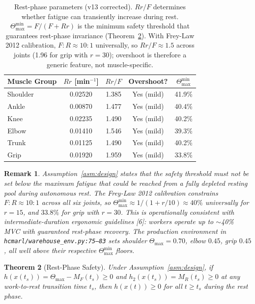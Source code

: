 \documentclass[11pt,a4paper]{article}
\newtheorem{theorem}{Theorem}[section]
\newtheorem{remark}[theorem]{Remark}
\begin{document}
\begin{table}[h]
\centering
\caption{Rest-phase parameters (v13 corrected). $Rr/F$ determines whether
fatigue can transiently increase during rest. $\Theta_{\max}^{\min} =
F/(F+Rr)$ is the minimum safety threshold that guarantees rest-phase
invariance (Theorem~\ref{thm:rest-safety}). With Frey-Law 2012
calibration, $F{:}R \approx 10{:}1$ universally, so $Rr/F \approx 1.5$
across joints (1.96 for grip with $r=30$); overshoot is therefore a
generic feature, not muscle-specific.}\label{tab:rest}
\begin{tabular}{lcccc}
\toprule
\textbf{Muscle Group} & $Rr$ [min$^{-1}$] & $Rr/F$ & \textbf{Overshoot?} & $\Theta_{\max}^{\min}$ \\
\midrule
Shoulder & 0.02520 & 1.385 & Yes (mild) & 41.9\% \\
Ankle    & 0.00870 & 1.477 & Yes (mild) & 40.4\% \\
Knee     & 0.02235 & 1.490 & Yes (mild) & 40.2\% \\
Elbow    & 0.01410 & 1.546 & Yes (mild) & 39.3\% \\
Trunk    & 0.01125 & 1.490 & Yes (mild) & 40.2\% \\
Grip     & 0.01920 & 1.959 & Yes (mild) & 33.8\% \\
\bottomrule
\end{tabular}
\end{table}

\begin{remark}\label{rem:design-interpretation}
Assumption~\ref{asm:design} states that the safety threshold must not
be set below the maximum fatigue that could be reached from a fully
depleted resting pool during autonomous rest. The Frey-Law 2012
calibration constrains $F{:}R \approx 10{:}1$ across all six joints,
so $\Theta_{\max}^{\min} \approx 1/(1 + r/10) \approx 40\%$
universally for $r=15$, and $33.8\%$ for grip with $r=30$. This is
operationally consistent with intermediate-duration ergonomic
guidelines [6]: workers operate up to $\sim$40\% MVC with
guaranteed rest-phase recovery. The production environment in
\texttt{hcmarl/warehouse\_env.py:75--83} sets shoulder
$\Theta_{\max} = 0.70$, elbow $0.45$, grip $0.45$, all well above
their respective $\Theta_{\max}^{\min}$ floors.
\end{remark}

\begin{theorem}[Rest-Phase Safety]\label{thm:rest-safety}
Under Assumption~\ref{asm:design}, if $h(x(t_s)) = \Theta_{\max} -
M_F(t_s) \geq 0$ and $h_2(x(t_s)) = M_R(t_s) \geq 0$ at any
work-to-rest transition time $t_s$, then $h(x(t)) \geq 0$ for all $t
\geq t_s$ during the rest phase.
\end{theorem}
\end{document}
